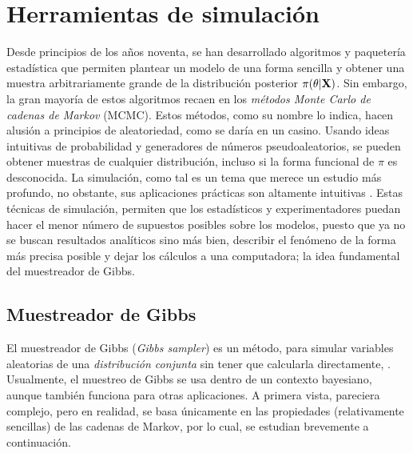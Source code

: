 \documentclass[../Main/Main.tex]{subfiles}
\begin{document}

\section{Herramientas de simulación} \label{sec:GibbsSampler}
Desde principios de los años noventa, se han desarrollado algoritmos y paquetería estadística que permiten plantear un modelo de una forma sencilla y obtener una muestra arbitrariamente grande de la distribución posterior $\pi(\theta|\mathbf{X})$. Sin embargo, la gran mayoría de estos algoritmos recaen en los \textit{métodos Monte Carlo de cadenas de Markov} (MCMC). Estos métodos, como su nombre lo indica, hacen alusión a principios de aleatoriedad, como se daría en un casino. Usando ideas intuitivas de probabilidad y generadores de números pseudoaleatorios, se pueden obtener muestras de cualquier distribución, incluso si la forma funcional de $\pi$ es desconocida. La simulación, como tal es un tema que merece un estudio más profundo, no obstante, sus aplicaciones prácticas son altamente intuitivas \autocite{robert2004monte}. Estas técnicas de simulación, permiten que los estadísticos y experimentadores puedan hacer el menor número de supuestos posibles sobre los modelos, puesto que ya no se buscan resultados analíticos sino más bien, describir el fenómeno de la forma más precisa posible y dejar los cálculos a una computadora; la idea fundamental del muestreador de Gibbs.

\subsection{Muestreador de Gibbs}
El muestreador de Gibbs (\textit{Gibbs sampler}) es un método, para simular variables aleatorias de una \textit{distribución conjunta} sin tener que calcularla directamente, \autocite{gelfand1990sampling}. Usualmente, el muestreo de Gibbs se usa dentro de un contexto bayesiano, aunque también funciona para otras aplicaciones. A primera vista, pareciera complejo, pero en realidad, se basa únicamente en las propiedades (relativamente sencillas) de las cadenas de Markov, por lo cual, se estudian brevemente a continuación.
\end{document}
